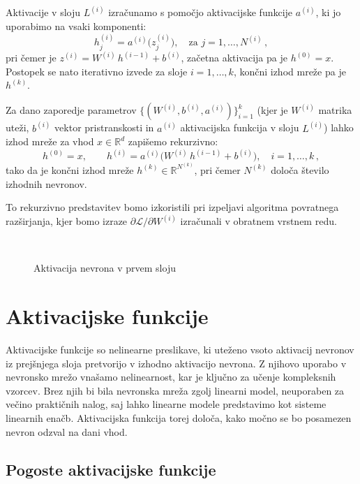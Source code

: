 Aktivacije v sloju $L^{(i)}$ izračunamo s pomočjo aktivacijske funkcije $a^{(i)}$, ki jo uporabimo na vsaki komponenti:
\[
  h^{(i)}_j = a^{(i)}\!\big(z^{(i)}_j\big), \quad \text{za } j = 1, \dots, N^{(i)}\,,
\] 
pri čemer je $z^{(i)} = W^{(i)}\,h^{(i-1)} + b^{(i)}$, začetna aktivacija pa je $h^{(0)} = x$. Postopek se nato iterativno izvede za sloje $i = 1, \dots, k$, končni izhod mreže pa je $h^{(k)}$.

Za dano zaporedje parametrov $\{(W^{(i)}, b^{(i)}, a^{(i)})\}_{i=1}^k$ (kjer je $W^{(i)}$ matrika uteži, $b^{(i)}$ vektor pristranskosti in $a^{(i)}$ aktivacijska funkcija v sloju $L^{(i)}$) lahko izhod mreže za vhod $x \in \mathbb{R}^d$ zapišemo rekurzivno:
\[
  h^{(0)} = x,\qquad 
  h^{(i)} = a^{(i)}\!\big(W^{(i)}\,h^{(i-1)} + b^{(i)}\big), \quad i = 1, \dots, k\,,
\]
tako da je končni izhod mreže $h^{(k)} \in \mathbb{R}^{N^{(k)}}$, pri čemer $N^{(k)}$ določa število izhodnih nevronov.

To rekurzivno predstavitev bomo izkoristili pri izpeljavi algoritma povratnega razširjanja, kjer bomo izraze $\partial \mathcal{L} / \partial W^{(i)}$ izračunali v obratnem vrstnem redu.

\begin{figure}[H]
  \centering
  \scalebox{0.85}{}
  \caption{Aktivacija nevrona v prvem sloju}~\label{fig:nn-activation}
\end{figure}


\section{Aktivacijske funkcije}

Aktivacijske funkcije so nelinearne preslikave, ki uteženo vsoto aktivacij nevronov iz prejšnjega sloja pretvorijo v izhodno aktivacijo nevrona. Z njihovo uporabo v nevronsko mrežo vnašamo nelinearnost, kar je ključno za učenje kompleksnih vzorcev. Brez njih bi bila nevronska mreža zgolj linearni model, neuporaben za večino praktičnih nalog, saj lahko linearne modele predstavimo kot sisteme linearnih enačb. Aktivacijska funkcija torej določa, kako močno se bo posamezen nevron odzval na dani vhod.

\subsection*{Pogoste aktivacijske funkcije}

